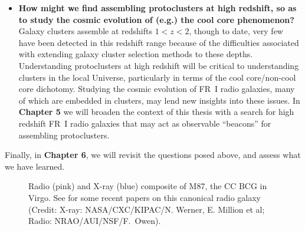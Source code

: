 \begin{itemize}
\item {\bf How might we find assembling protoclusters 
at high redshift, so as to study the cosmic evolution of (e.g.) the cool 
core phenomenon? } Galaxy clusters assemble at redshifts $1 < z < 2$, though 
to date, very few have been detected in this redshift range because 
of the difficulties associated with extending galaxy cluster selection 
methods to these depths. Understanding protoclusters at high redshift 
will be critical to understanding clusters in the local Universe, 
particularly in terms of the cool core/non-cool core dichotomy. 
Studying the cosmic evolution of FR~I radio galaxies, many of which are embedded
in clusters, may lend new insights into these issues. 
In {\bf Chapter 5} we
will broaden the context of this thesis with a search for high redshift FR~I radio
galaxies that may act as observable ``beacons'' for assembling protoclusters. 
 


\end{itemize}

\noindent Finally, in {\bf Chapter 6}, we will revisit the questions 
posed above, and assess what we have learned. 





\begin{figure}

\caption[The cool core cluster M87 ({\it Chandra} X-ray, VLA Radio)]{Radio (pink) and X-ray (blue) composite 
of M87, the CC BCG in Virgo. See \citet{harris06,forman07,sparks09,batcheldor10} for some recent papers on this canonical radio galaxy (Credit: X-ray: NASA/CXC/KIPAC/N. Werner, E. Million et al; Radio: NRAO/AUI/NSF/F.~Owen).}
\end{figure}


 
